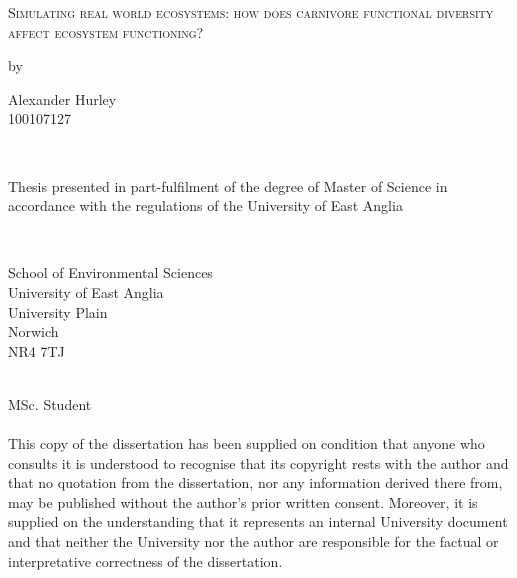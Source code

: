 \begin{titlepage}
\vspace{5cm}

\begin{center}
\begin{Large}
\textsc{Simulating real world ecosystems: how does carnivore functional diversity affect ecosystem functioning?}\\
\end{Large}
\vspace{1.5cm}
by
\\
\vspace{1.5cm}
\begin{large}
Alexander Hurley \\ \vspace{0.5cm} 
100107127
\end{large}
\\
\vspace{5cm}
\begin{large}
Thesis presented in part-fulfilment of the degree of Master of Science in accordance with the
regulations of the University of East Anglia
\end{large}
\\
\end{center}
\vspace{3.5cm}
\begin{small}
School of Environmental Sciences\\
University of East Anglia\\
University Plain\\
Norwich\\
NR4 7TJ\\
\end{small}
\\
\footnotesize
{} MSc. Student\\\\
This copy of the dissertation has been supplied on condition that anyone who consults it is understood to recognise that 
its copyright rests with the author and that no quotation from the dissertation, nor any information derived there from, may 
be published without the author’s prior written consent. Moreover, it is supplied on the understanding that it represents an 
internal University document and that neither the University nor the author are responsible for the factual or interpretative 
correctness of the dissertation.
\end{titlepage}